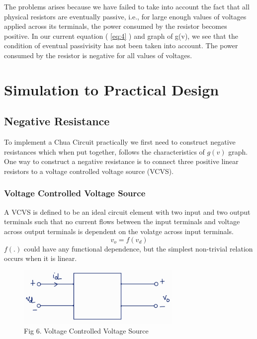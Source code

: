 \documentclass[12pt]{article}
\newcommand*{\myref}[1]{%
  \begingroup
    \hypersetup{
      linkcolor=linkequation,
      linkbordercolor=linkequation,
    }%
    \ref{#1}%
  \endgroup
}
\begin{document}
The problems arises because we have failed to take into account the fact that all physical resistors are eventually passive, i.e., for large enough values of voltages applied across its terminals, the power consumed by the resistor becomes positive. \linebreak
In our current equation (\myref{eq:4}) and graph of g(v), we see that the condition of eventual passivisity has not been taken into account. The power consumed by the resistor is negative for all values of voltages.
\section{Simulation to Practical Design}
\subsection{Negative Resistance}
To implement a Chua Circuit practically we first need to construct negative resistances which when put together, follows the characteristics of $g(v)$ graph. One way to construct a negative resistance is to connect three positive linear resistors to a voltage controlled voltage source (VCVS).
%
\subsubsection{Voltage Controlled Voltage Source}
A VCVS is defined to be an ideal circuit element with two input and two output terminals such that no current flows between the input terminals and voltage across output terminals is dependent on the volatge across input terminals.
\[ v_o= f(v_d) \]
$f(.)$ could have any functional dependence, but the simplest non-trivial relation occurs when it is linear. 
\begin{figure}[H]
	\centering
	\includegraphics[width=0.7\textwidth]{Images/fig6_vcvs.png}
	\caption{Fig 6. Voltage Controlled Voltage Source}
\end{figure} 
%
\end{document}
